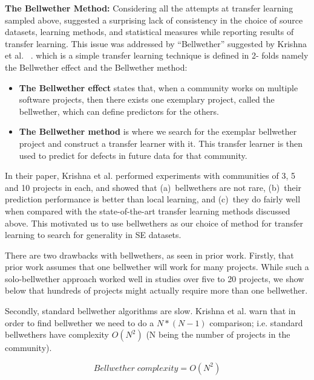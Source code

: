 \documentclass[10pt,journal,compsoc]{IEEEtran}
\newcommand{\bi}{\begin{itemize}}
\newcommand{\ei}{\end{itemize}}
\begin{document}
\textbf{The Bellwether Method:}
Considering all the attempts at transfer learning sampled above, suggested a surprising lack of consistency in the choice of source datasets, learning methods, and statistical measures while reporting results of transfer learning. This issue was addressed by ``Bellwether'' suggested by Krishna et al. ~\cite{krishna2017simpler,krishna16}. which is a simple transfer learning technique is defined in 2- folds namely the Bellwether effect and the Bellwether method:

\bi

    \item \textbf{The Bellwether effect} states that, when a community works on multiple software projects,  then there exists one exemplary project, called the bellwether, which can define predictors for the others.
    
    \item \textbf{The Bellwether method} is where we search for the exemplar bellwether project and construct a transfer learner with it. This transfer learner is then used to predict for defects in future data for that community.

\ei

In their paper, Krishna et al. performed experiments with communities of 3, 5 and 10 projects in each, and showed that (a)~bellwethers are not rare, (b)~their prediction performance is better than local learning, and (c)~they do fairly well when compared with 
the state-of-the-art transfer learning methods discussed above.
This motivated us to use  bellwethers as our choice of method for transfer learning to search for generality in SE datasets. 

There are two drawbacks with bellwethers, as seen in prior work.
Firstly, that prior work assumes that one bellwether will work for many projects. While such a solo-bellwether approach worked well
in studies over five to 20 projects, we show below that hundreds of projects might actually require more than one bellwether.

Secondly, standard bellwether algorithms are   slow.
 Krishna et al. warn that in order to find bellwether we need to do a $ N*(N-1) $ comparison; i.e. standard bellwethers
have complexity $ O(N^2) $ (N being the number of projects in the community). 

\begin{equation}
\label{eq:bellwether}
    \mathit{Bellwether\; complexity } = O(N^2)
\end{equation}
\end{document}
